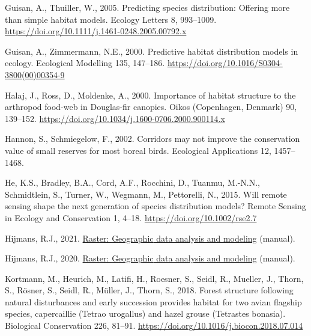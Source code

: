 \documentclass[
]{article}
\newlength{\cslhangindent}
\newlength{\cslentryspacingunit} %
\newenvironment{CSLReferences}[2] %
 {%
  \setlength{\parindent}{0pt}
  \ifodd #1
  \let\oldpar\par
  \def\par{\hangindent=\cslhangindent\oldpar}
  \fi
  \setlength{\parskip}{#2\cslentryspacingunit}
 }%
 {}
\begin{document}
\begin{CSLReferences}{1}{0}
\leavevmode{}%
Guisan, A., Thuiller, W., 2005. Predicting species distribution: Offering more than simple habitat models. Ecology Letters 8, 993--1009. \url{https://doi.org/10.1111/j.1461-0248.2005.00792.x}

\leavevmode{}%
Guisan, A., Zimmermann, N.E., 2000. Predictive habitat distribution models in ecology. Ecological Modelling 135, 147--186. \url{https://doi.org/10.1016/S0304-3800(00)00354-9}

\leavevmode{}%
Halaj, J., Ross, D., Moldenke, A., 2000. Importance of habitat structure to the arthropod food-web in {Douglas}-fir canopies. Oikos (Copenhagen, Denmark) 90, 139--152. \url{https://doi.org/10.1034/j.1600-0706.2000.900114.x}

\leavevmode{}%
Hannon, S., Schmiegelow, F., 2002. Corridors may not improve the conservation value of small reserves for most boreal birds. Ecological Applications 12, 1457--1468.

\leavevmode{}%
He, K.S., Bradley, B.A., Cord, A.F., Rocchini, D., Tuanmu, M.-N.N., Schmidtlein, S., Turner, W., Wegmann, M., Pettorelli, N., 2015. Will remote sensing shape the next generation of species distribution models? Remote Sensing in Ecology and Conservation 1, 4--18. \url{https://doi.org/10.1002/rse2.7}

\leavevmode{}%
Hijmans, R.J., 2021. \href{https://CRAN.R-project.org/package=raster}{Raster: {Geographic} data analysis and modeling} (manual).

\leavevmode{}%
Hijmans, R.J., 2020. \href{https://CRAN.R-project.org/package=raster}{Raster: {Geographic} data analysis and modeling} (manual).

\leavevmode{}%
Kortmann, M., Heurich, M., Latifi, H., Roesner, S., Seidl, R., Mueller, J., Thorn, S., Rösner, S., Seidl, R., Müller, J., Thorn, S., 2018. Forest structure following natural disturbances and early succession provides habitat for two avian flagship species, capercaillie ({Tetrao} urogallus) and hazel grouse ({Tetrastes} bonasia). Biological Conservation 226, 81--91. \url{https://doi.org/10.1016/j.biocon.2018.07.014}


\end{CSLReferences}
\end{document}
